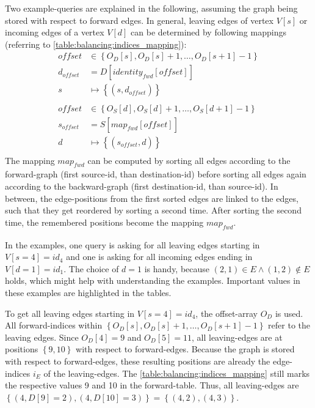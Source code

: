         Two example-queries are explained in the following, assuming the graph being stored with respect to forward edges.
        In general, leaving edges of vertex $V[s]$ or incoming edges of a vertex $V[d]$ can be determined by following mappings (referring to \cref{table:balancing:indices_mapping}):
        \begin{equation}
        \label{eq:balancing:indices_mapping}
        \begin{aligned}
            \mathit{offset} &\in \left\{ O_D \left[ s \right], O_D \left[ s \right] + 1, \dots, O_D \left[ s+1 \right] - 1 \right\} \\
            d_\mathit{offset} &= D \left[ \mathit{identity}_\mathit{fwd} \left[ \mathit{offset} \right] \right] \\
            s &\mapsto \left\{ \left( s, d_\mathit{offset} \right) \right\} \\
            \\
            \mathit{offset} &\in \left\{ O_S \left[ d \right], O_S \left[ d \right] + 1, \dots, O_S \left[ d+1 \right] - 1 \right\} \\
            s_\mathit{offset} &= S \left[ \mathit{map}_\mathit{fwd} \left[ \mathit{offset} \right] \right] \\
            d &\mapsto \left\{ \left( s_\mathit{offset}, d \right) \right\} \\
        \end{aligned}
        \end{equation}
        The mapping $\mathit{map}_\mathit{fwd}$ can be computed by sorting all edges according to the forward-graph (first source-id, than destination-id) before sorting all edges again according to the backward-graph (first destination-id, than source-id).
        In between, the edge-positions from the first sorted edges are linked to the edges, such that they get reordered by sorting a second time.
        After sorting the second time, the remembered positions become the mapping $\mathit{map}_\mathit{fwd}$.

        In the examples, one query is asking for all leaving edges starting in $V[s=4]=\mathit{id}_4$ and one is asking for all incoming edges ending in $V[d=1]=\mathit{id}_1$.
        The choice of $d=1$ is handy, because $(2, 1) \in E \wedge (1, 2) \notin E$ holds, which might help with understanding the examples.
        Important values in these examples are highlighted in the tables.

        To get all leaving edges starting in $V[s=4]=\mathit{id}_4$, the offset-array $O_D$ is used.
        All forward-indices within $\left\{ O_D[s], O_D[s] + 1, \dots, O_D[s+1] - 1 \right\}$ refer to the leaving edges.
        Since $O_D[4]=9$ and $O_D[5]=11$, all leaving-edges are at positions $\left\{ 9, 10 \right\}$ with respect to forward-edges.
        Because the graph is stored with respect to forward-edges, these resulting positions are already the edge-indices $i_E$ of the leaving-edges.
        The \cref{table:balancing:indices_mapping} still marks the respective values \num{9} and \num{10} in the forward-table.
        Thus, all leaving-edges are $\left\{ (4, D[9]=2), (4, D[10]=3) \right\} = \left\{ (4,2), (4,3) \right\}$.

